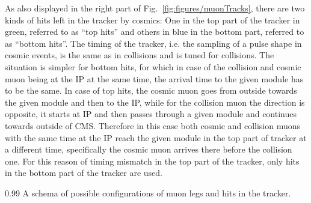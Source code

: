 As also displayed in the right part of Fig.~\ref{fig:figures/muonTracks}, there are two kinds of hits left in the tracker by cosmics: One in the top part of the tracker in green, referred to as ``top hits'' and others in blue in the bottom part, referred to as ``bottom hits''. The timing of the tracker, i.e. the sampling of a pulse shape in cosmic events, is the same as in collisions and is tuned for collisions.  The situation is simpler for bottom hits, for which in case of the collision and cosmic muon being at the IP at the same time, the arrival time to the given module has to be the same. In case of top hits, the cosmic muon goes from outside towards the given module and then to the IP, while for the collision muon the direction is opposite, it starts at IP and then passes through a given module and continues towards outside of CMS. Therefore in this case both cosmic and collision muons with the same time at the IP reach the given module in the top part of tracker at a different time, specifically the cosmic muon arrives there before the collision one. For this reason of timing mismatch in the top part of the tracker, only hits in the bottom part of the tracker are used.

                 {0.99}       %
                 { A schema of possible configurations of muon legs and hits in the tracker. }


